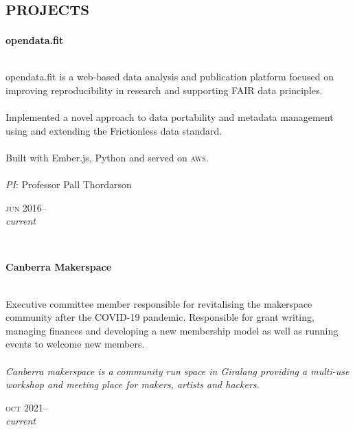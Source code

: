 
\vspace{-0.6cm}
\section*{\textsc{projects}}
\vspace{-0.2cm}

\begin{minipage}[t]{\mainboxwidth\textwidth}
\textbf{opendata.fit}\\
{\small
\\
opendata.fit is a web-based data analysis and publication platform focused on improving reproducibility in research and supporting FAIR data principles.\\
\\
Implemented a novel approach to data portability and metadata management using and extending the Frictionless data standard.\\
\\
Built with Ember.js, Python and served on \textsc{aws}.\\
\\
\textit{PI}: Professor Pall Thordarson\\
\par}
\end{minipage}
\begin{minipage}[t]{\detailboxwidth\textwidth}
{
\hfill \textsc{jun} 2016--\\ 
\hspace*{0pt} \hfill \textit{\small current}
\par
}
\end{minipage}
\\

\begin{minipage}[t]{\mainboxwidth\textwidth}
\textbf{Canberra Makerspace}\\
\\
{\small
Executive committee member responsible for revitalising the makerspace community after the COVID-19 pandemic. Responsible for grant writing, managing finances and developing a new membership model as well as running events to welcome new members.
\\
\\
\textit{Canberra makerspace is a community run space in Giralang providing a multi-use workshop and meeting place for makers, artists and hackers.}
\par}
\end{minipage}
\begin{minipage}[t]{\detailboxwidth\textwidth}
{
\hfill \textsc{oct} 2021--\\ 
\hspace*{0pt} \hfill \textit{\small current}
\par
}
\end{minipage}
\\


